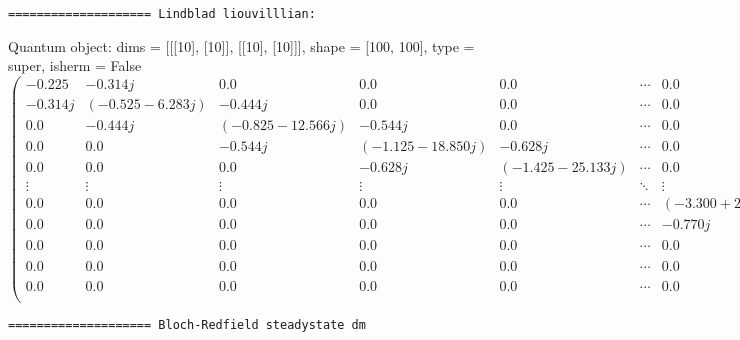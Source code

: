 \documentclass{article}
\begin{document}
    
    \begin{Verbatim}[commandchars=\\\{\}]
==================== Lindblad liouvilllian:
    \end{Verbatim}

    Quantum object: dims = [[[10], [10]], [[10], [10]]], shape = [100, 100], type = super, isherm = False\begin{equation*}\begin{pmatrix}-0.225 & -0.314j & 0.0 & 0.0 & 0.0 & \cdots & 0.0 & 0.0 & 0.0 & 0.0 & 0.0\\-0.314j & (-0.525-6.283j) & -0.444j & 0.0 & 0.0 & \cdots & 0.0 & 0.0 & 0.0 & 0.0 & 0.0\\0.0 & -0.444j & (-0.825-12.566j) & -0.544j & 0.0 & \cdots & 0.0 & 0.0 & 0.0 & 0.0 & 0.0\\0.0 & 0.0 & -0.544j & (-1.125-18.850j) & -0.628j & \cdots & 0.0 & 0.0 & 0.0 & 0.0 & 0.0\\0.0 & 0.0 & 0.0 & -0.628j & (-1.425-25.133j) & \cdots & 0.0 & 0.0 & 0.0 & 0.0 & 0.0\\\vdots & \vdots & \vdots & \vdots & \vdots & \ddots & \vdots & \vdots & \vdots & \vdots & \vdots\\0.0 & 0.0 & 0.0 & 0.0 & 0.0 & \cdots & (-3.300+25.133j) & -0.770j & 0.0 & 0.0 & 0.0\\0.0 & 0.0 & 0.0 & 0.0 & 0.0 & \cdots & -0.770j & (-3.600+18.850j) & -0.831j & 0.0 & 0.0\\0.0 & 0.0 & 0.0 & 0.0 & 0.0 & \cdots & 0.0 & -0.831j & (-3.900+12.566j) & -0.889j & 0.0\\0.0 & 0.0 & 0.0 & 0.0 & 0.0 & \cdots & 0.0 & 0.0 & -0.889j & (-4.200+6.283j) & -0.942j\\0.0 & 0.0 & 0.0 & 0.0 & 0.0 & \cdots & 0.0 & 0.0 & 0.0 & -0.942j & -3.375\\\end{pmatrix}\end{equation*}

    
    \begin{Verbatim}[commandchars=\\\{\}]
==================== Bloch-Redfield steadystate dm
    \end{Verbatim}
\end{document}
